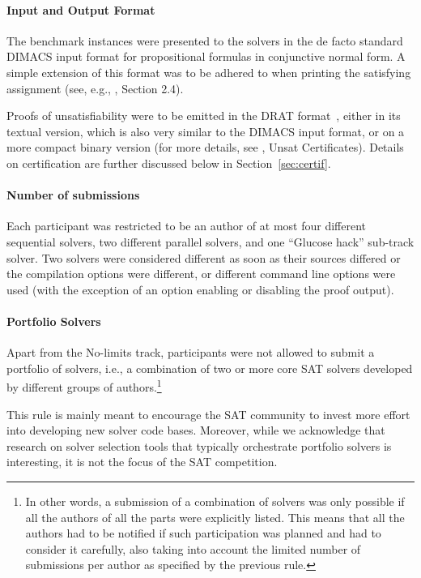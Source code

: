 \documentclass{elsarticle}
\begin{document}
\paragraph{Input and Output Format}

The benchmark instances were presented to the solvers in the de facto standard
DIMACS input format for propositional formulas in conjunctive normal form.
A simple extension of this format was to be adhered to when printing 
the satisfying assignment 
(see, e.g., \cite{DBLP:journals/jsat/HeuleJS19}, Section 2.4).

Proofs of unsatisfiability were to be emitted in the DRAT format~\cite{DRATtrim},
either in its textual version, which is also very similar to the DIMACS input format,
or on a more compact binary version (for more details, see \cite{satComp2020www}, Unsat Certificates).
%
Details on certification are further discussed below in Section~\ref{sec:certif}.

\paragraph{Number of submissions}

Each participant was restricted to be an author of at most four different sequential solvers,
two different parallel solvers, and one ``Glucose hack'' sub-track solver.
Two solvers were considered different as soon as their sources differed
or the compilation options were different, or different command line options were used
(with the exception of an option enabling or disabling the proof output).

\paragraph{Portfolio Solvers}

Apart from the No-limits track, participants were not allowed to submit a portfolio of solvers,
i.e., a combination of two or more core SAT solvers developed by different groups of authors.\footnote{
In other words, a submission of a combination of solvers was only possible if all the authors of all the parts
were explicitly listed. This means that all the authors had to be notified if such participation
was planned and had to consider it carefully, also taking into account the limited number of submissions per author
as specified by the previous rule.}

This rule is mainly meant to encourage the SAT community to invest more effort into developing new solver code bases.
Moreover, while we acknowledge that research on solver selection tools that typically orchestrate portfolio solvers 
is interesting, it is not the focus of the SAT competition.
\end{document}
